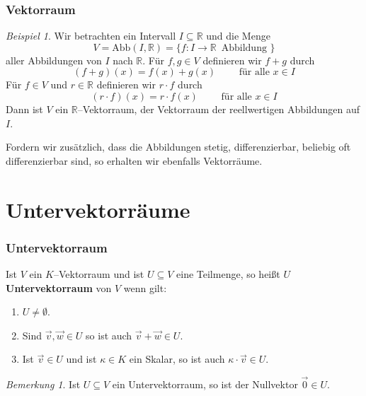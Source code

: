 \documentclass[hyperref={pdfpagelabels=false}]{beamer}
\theoremstyle{plain}%
\theoremstyle{definition}
\theoremstyle{remark}
\newtheorem*{beispiel}{Beispiel}
\newtheorem*{notiz}{Bemerkung}
\def \R{\mathbb R}
\newcommand{\vektor}[1]{\overrightarrow{#1}}
\begin{document}
\begin{frame}
\frametitle{Vektorraum}

\begin{beispiel}
Wir betrachten ein Intervall $ I \subseteq \mathbb R$ und die Menge 
	$$ V = \mathrm{Abb}(I, \R) = \{ f: I \longrightarrow \R \, \text{ Abbildung }\} $$
aller Abbildungen von $I$ nach $\R$. \pause  Für $f, g \in V$ definieren wir $f+g$ durch 
	$$ (f+g)(x) = f(x) + g(x) \qquad \text{ für alle } x \in I $$ \pause
Für $f \in V$ und $r \in \R$ definieren wir $r \cdot f$ durch
	$$ (r \cdot f)(x) = r \cdot f(x) \qquad \text{ für alle } x \in I $$
Dann ist $V$ ein $\R$--Vektorraum, der Vektorraum der reellwertigen Abbildungen auf $I$. 

\pause 
Fordern wir zusätzlich, dass die Abbildungen stetig, differenzierbar, beliebig oft differenzierbar sind, 
so erhalten wir ebenfalls Vektorräume. 
\end{beispiel}

\end{frame}

\section{Untervektorräume}

\begin{frame}
\frametitle{Untervektorraum}

\begin{definition} Ist $V$ ein $K$--Vektorraum und  ist $U \subseteq V$ eine 
Teilmenge, so heißt $U$ \textbf{Untervektorraum} von $V$ wenn gilt:

\begin{enumerate}
\item<2-> $U \neq \emptyset$. 
\item<3-> Sind $\vektor{v}, \vektor{w} \in U$ so ist auch 
$\vektor{v} + \vektor{w} \in U$.
\item<4-> Ist $\vektor{v} \in U$ und ist $\kappa \in K$ ein Skalar, so ist 
auch $\kappa \cdot \vektor{v} \in U$.
\end{enumerate}
\end{definition}

\pause 

\begin{notiz}
Ist $U \subseteq V$ ein Untervektorraum, so ist der Nullvektor $\vektor{0} \in U$. 
\end{notiz}


\end{frame}
\end{document}
